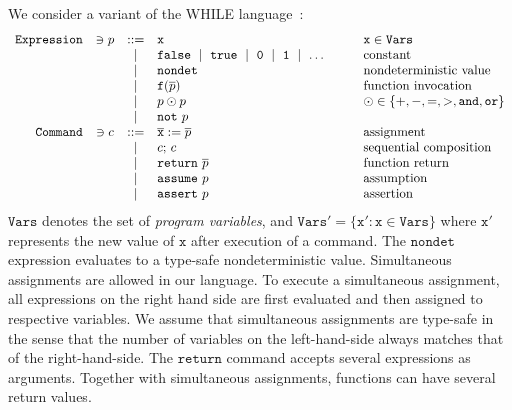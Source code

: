 
We consider a variant of the WHILE language~\cite{NielsonHC99}:
\begin{equation*}
  \begin{array}{rccll}
    \mathtt{Expression} & \ni p & ::= &
    \mathtt{x} & \mathtt{x} \in \mathtt{Vars}\\
    & & \mid &
    \mathtt{false}\ \mid\ \mathtt{true}\ \mid\ 
    \mathtt{0}\ \mid\ \mathtt{1}\ \mid\ \ldots\hspace{.06\textwidth} &
    \textmd{constant}\\
    & & \mid &
    \mathtt{nondet} & \textmd{nondeterministic value}\\
    & & \mid &
    \mathtt{f}(\overline{p}) &
    \textmd{function invocation}\\
    & & \mid &
    p \odot p  & \odot \in \{ +, -, =, >, \mathtt{and}, \mathtt{or} \}\\
    & & \mid & \mathtt{not}\ p\\
    \mathtt{Command} & \ni c & ::= &
    \overline{\mathtt{x}} := \overline{p}
    & \textmd{assignment}\\
    & & \mid &
    c\mathtt{;}\ c &
    \textmd{sequential composition}\\
    & & \mid &
    \mathtt{return}\ \overline{p} & \textmd{function return}\\
    & & \mid &
    \mathtt{assume}\ p & \textmd{assumption}\\
    & & \mid &
    \mathtt{assert}\ p & \textmd{assertion}
  \end{array}
\end{equation*}
$\mathtt{Vars}$ denotes the set of \emph{program variables}, and 
$\mathtt{Vars}' = \{ \mathtt{x}' : \mathtt{x} \in \mathtt{Vars} \}$
where $\mathtt{x}'$ represents the new value of $\mathtt{x}$ after
execution of a command.
The $\mathtt{nondet}$ expression evaluates to a type-safe
nondeterministic value.
Simultaneous assignments are allowed in our language. To
execute a simultaneous assignment, all expressions on the right hand
side are first evaluated and then assigned to respective variables. 
We assume that simultaneous assignments are type-safe in the sense that the number of variables on the left-hand-side always matches that of the right-hand-side.
The $\mathtt{return}$ command accepts several expressions as arguments.
Together with simultaneous assignments, functions can have several
return values. 

